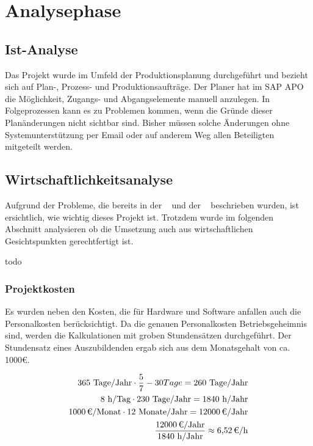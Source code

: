 \section{Analysephase} 
\label{sec:Analysephase}

\subsection{Ist-Analyse} 
\label{sec:IstAnalyse}
Das Projekt wurde im Umfeld der Produktionsplanung durchgeführt und bezieht sich auf Plan-, Prozess- und Produktionsaufträge. Der Planer hat im SAP \ac{APO} die	Möglichkeit, Zugangs- und Abgangselemente manuell anzulegen. In Folgeprozessen kann es zu Problemen kommen, wenn die Gründe dieser Planänderungen nicht sichtbar sind. Bisher müssen solche Änderungen ohne Systemunterstützung per Email oder auf anderem Weg allen Beteiligten mitgeteilt werden.

\subsection{Wirtschaftlichkeitsanalyse}
\label{sec:Wirtschaftlichkeitsanalyse}
Aufgrund der Probleme, die bereits in der ~ und der ~ beschrieben wurden, ist ersichtlich, wie wichtig dieses Projekt ist. Trotzdem wurde im folgenden Abschnitt analysieren ob die Umsetzung auch aus wirtschaftlichen Gesichtspunkten gerechtfertigt ist.

todo

\subsubsection{Projektkosten}
\label{sec:Projektkosten}
Es wurden neben den Kosten, die für Hardware und Software anfallen auch die Personalkosten berücksichtigt.
Da die genauen Personalkosten Betriebsgeheimnis sind, werden die Kalkulationen mit groben Stundensätzen durchgeführt. Der Stundensatz eines Auszubildenden ergab sich aus dem Monatsgehalt von ca. 1000€.
		
\begin{eqnarray}
	365 \mbox{ Tage/Jahr} \cdot \frac{5}{7} - 30 Tage = 260 \mbox{ Tage/Jahr}\\
	8 \mbox{ h/Tag} \cdot 230 \mbox{ Tage/Jahr} = 1840 \mbox{ h/Jahr}\\
	\eur{1000}\mbox{/Monat} \cdot 12 \mbox{ Monate/Jahr} = \eur{12000} \mbox{/Jahr}\\
	\frac{\eur{12000} \mbox{/Jahr}}{1840 \mbox{ h/Jahr}} \approx \eur{6,52}\mbox{/h}
\end{eqnarray}
	
